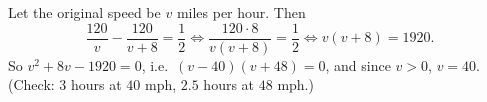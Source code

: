 Let the original speed be $v$ miles per hour. Then
\[
\dfrac{120}{v}-\dfrac{120}{v+8}=\dfrac{1}{2}\iff\dfrac{120\cdot8}{v(v+8)}=\dfrac{1}{2}\iff v(v+8)=1920 .
\]
So $v^2+8v-1920=0$, i.e.\ $(v-40)(v+48)=0$, and since $v>0$, $v=\boxed{40}$. (Check: $3$ hours at $40$ mph, $2.5$ hours at $48$ mph.)

